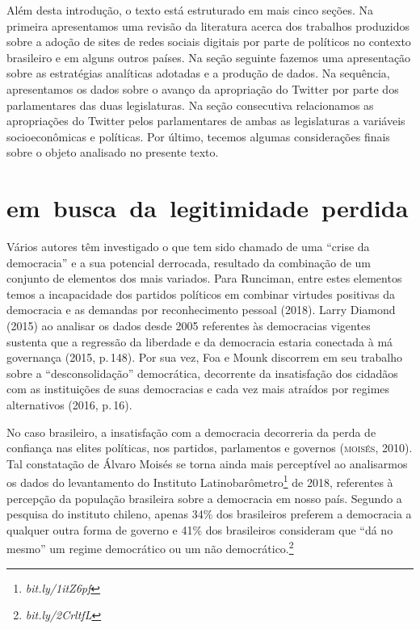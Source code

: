 Além desta introdução, o texto está estruturado em mais cinco seções. Na
primeira apresentamos uma revisão da literatura acerca dos trabalhos
produzidos sobre a adoção de sites de redes sociais digitais por parte
de políticos no contexto brasileiro e em alguns outros países. Na seção
seguinte fazemos uma apresentação sobre as estratégias analíticas
adotadas e a produção de dados. Na sequência, apresentamos os dados
sobre o avanço da apropriação do Twitter por parte dos parlamentares das
duas legislaturas. Na seção consecutiva relacionamos as apropriações do
Twitter pelos parlamentares de ambas as legislaturas a variáveis
socioeconômicas e políticas. Por último, tecemos algumas considerações
finais sobre o objeto analisado no presente texto.


\section{em~busca~da~legitimidade~perdida}

Vários autores têm investigado o que tem sido chamado de uma ``crise da
democracia'' e a sua potencial derrocada, resultado da combinação de um
conjunto de elementos dos mais variados. Para Runciman, entre estes
elementos temos a incapacidade dos partidos políticos em combinar
virtudes positivas da democracia e as demandas por reconhecimento
pessoal (2018). Larry Diamond (2015) ao analisar os dados desde 2005
referentes às democracias vigentes sustenta que a regressão da liberdade
e da democracia estaria conectada à má governança (2015, p.\,148). Por sua
vez, Foa e Mounk discorrem em seu trabalho sobre a ``desconsolidação''
democrática, decorrente da insatisfação dos cidadãos com as instituições
de suas democracias e cada vez mais atraídos por regimes alternativos
(2016, p.\,16).

No caso brasileiro, a insatisfação com a democracia decorreria da perda
de confiança nas elites políticas, nos partidos, parlamentos e governos
(\textsc{moisés}, 2010). Tal constatação de Álvaro Moisés se torna ainda mais
perceptível ao analisarmos os dados do levantamento do Instituto
Latinobarômetro\footnote{\emph{bit.ly/1itZ6pf}}
de 2018, referentes à percepção da população brasileira sobre a
democracia em nosso país. Segundo a pesquisa do instituto chileno,
apenas 34\% dos brasileiros preferem a democracia a qualquer outra forma
de governo e 41\% dos brasileiros consideram que ``dá no mesmo'' um
regime democrático ou um não democrático.\footnote{\emph{bit.ly/2CrltfL}}

